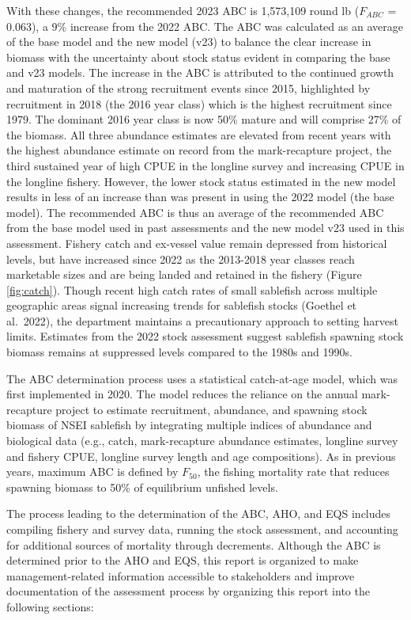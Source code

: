 \documentclass[
]{article}
\begin{document}
With these changes, the recommended 2023 ABC is 1,573,109 round lb (\(F_{ABC}\) = 0.063), a 9\% increase from the 2022 ABC. The ABC was calculated as an average of the base model and the new model (v23) to balance the clear increase in biomass with the uncertainty about stock status evident in comparing the base and v23 models. The increase in the ABC is attributed to the continued growth and maturation of the strong recruitment events since 2015, highlighted by recruitment in 2018 (the 2016 year class) which is the highest recruitment since 1979. The dominant 2016 year class is now 50\% mature and will comprise 27\% of the biomass. All three abundance estimates are elevated from recent years with the highest abundance estimate on record from the mark-recapture project, the third sustained year of high CPUE in the longline survey and increasing CPUE in the longline fishery. However, the lower stock status estimated in the new model results in less of an increase than was present in using the 2022 model (the base model). The recommended ABC is thus an average of the recommended ABC from the base model used in past assessments and the new model v23 used in this assessment. Fishery catch and ex-vessel value remain depressed from historical levels, but have increased since 2022 as the 2013-2018 year classes reach marketable sizes and are being landed and retained in the fishery (Figure \ref{fig:catch}). Though recent high catch rates of small sablefish across multiple geographic areas signal increasing trends for sablefish stocks (Goethel et al.~2022), the department maintains a precautionary approach to setting harvest limits. Estimates from the 2022 stock assessment suggest sablefish spawning stock biomass remains at suppressed levels compared to the 1980s and 1990s.

The ABC determination process uses a statistical catch-at-age model, which was first implemented in 2020. The model reduces the reliance on the annual mark-recapture project to estimate recruitment, abundance, and spawning stock biomass of NSEI sablefish by integrating multiple indices of abundance and biological data (e.g., catch, mark-recapture abundance estimates, longline survey and fishery CPUE, longline survey length and age compositions). As in previous years, maximum ABC is defined by \(F_{50}\), the fishing mortality rate that reduces spawning biomass to 50\% of equilibrium unfished levels.

The process leading to the determination of the ABC, AHO, and EQS includes compiling fishery and survey data, running the stock assessment, and accounting for additional sources of mortality through decrements. Although the ABC is determined prior to the AHO and EQS, this report is organized to make management-related information accessible to stakeholders and improve documentation of the assessment process by organizing this report into the following sections:
\end{document}
